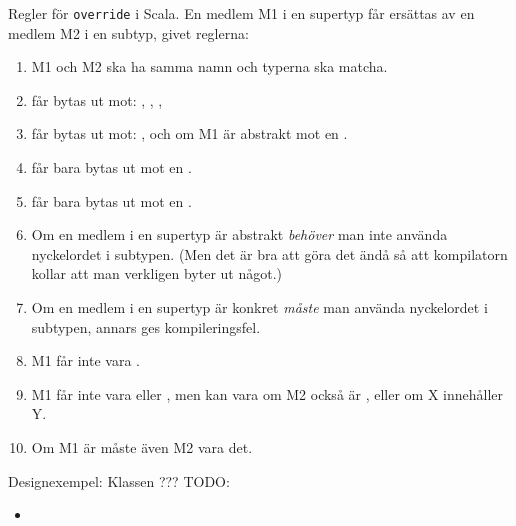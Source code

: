 \begin{Slide}{Regler för \texttt{override} i Scala.} \fontsize{8}{11}\selectfont
\label{slideW05:overriderules}
En medlem M1 i en supertyp får ersättas av en medlem M2 i en subtyp, givet reglerna:
\begin{enumerate}
\item M1 och M2 ska ha samma namn och typerna ska matcha.
\item {} får bytas ut mot: , , , 
\item {} får bytas ut mot: , och om M1 är abstrakt mot en .
\item {} får bara bytas ut mot en .
\item {} får bara bytas ut mot en .
\item Om en medlem i en supertyp är abstrakt \emph{behöver} man inte använda nyckelordet  i subtypen. (Men det är bra att göra det ändå så att kompilatorn kollar att man verkligen byter ut något.) 
\item Om en medlem i en supertyp är konkret \emph{måste} man använda nyckelordet  i subtypen, annars ges kompileringsfel.
\item M1 får inte vara .
\item M1 får inte vara  eller , men kan vara  om M2 också är , eller  om X innehåller Y.   
\item Om M1 är  måste även M2 vara det.

\end{enumerate}
\end{Slide}



\begin{Slide}{Designexempel: Klassen ???}\small
TODO:
  \begin{itemize} 
  \item 
  \end{itemize}
\end{Slide}










